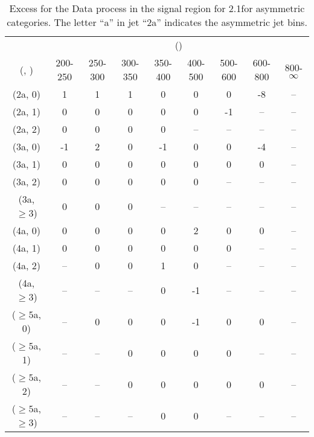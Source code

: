 \begin{table}[h!]
\tiny
\centering
\caption{Excess for the Data process in the signal region for 2.1\ifb for asymmetric categories. The letter ``a'' in jet \eg ``2a''  indicates the asymmetric jet bins.\label{tab:excesssep_sig_data_asym}}
\begin{tabular}
{ccccccccc}
	\hline\hline
	& \multicolumn{8}{c}{\scalht (\gev)} \\ 
	 (\njet,  \nb) & 200-250 & 250-300 & 300-350 & 350-400 & 400-500 & 500-600 & 600-800 & 800-$\infty$ \\ [0.8ex] 
\hline
	(2a, 0) & 1 & 1 & 1 & 0 & 0 & 0 & -8 & -- \\[0.5ex] 
	(2a, 1) & 0 & 0 & 0 & 0 & 0 & -1 & -- & -- \\[0.5ex] 
	(2a, 2) & 0 & 0 & 0 & 0 & -- & -- & -- & -- \\[0.5ex] 
	(3a, 0) & -1 & 2 & 0 & -1 & 0 & 0 & -4 & -- \\[0.5ex] 
	(3a, 1) & 0 & 0 & 0 & 0 & 0 & 0 & 0 & -- \\[0.5ex] 
	(3a, 2) & 0 & 0 & 0 & 0 & 0 & -- & -- & -- \\[0.5ex] 
	(3a, $\ge3$) & 0 & 0 & 0 & -- & -- & -- & -- & -- \\[0.5ex] 
	(4a, 0) & 0 & 0 & 0 & 0 & 2 & 0 & 0 & -- \\[0.5ex] 
	(4a, 1) & 0 & 0 & 0 & 0 & 0 & 0 & -- & -- \\[0.5ex] 
	(4a, 2) & -- & 0 & 0 & 1 & 0 & -- & -- & -- \\[0.5ex] 
	(4a, $\ge3$) & -- & -- & -- & 0 & -1 & -- & -- & -- \\[0.5ex] 
	($\ge5$a, 0) & -- & 0 & 0 & 0 & -1 & 0 & 0 & -- \\[0.5ex] 
	($\ge5$a, 1) & -- & -- & 0 & 0 & 0 & 0 & -- & -- \\[0.5ex] 
	($\ge5$a, 2) & -- & -- & 0 & 0 & 0 & 0 & 0 & -- \\[0.5ex] 
	($\ge5$a, $\ge3$) & -- & -- & -- & 0 & 0 & -- & -- & -- \\[0.5ex] 
	\hline
	\hline
\end{tabular}
\end{table}
